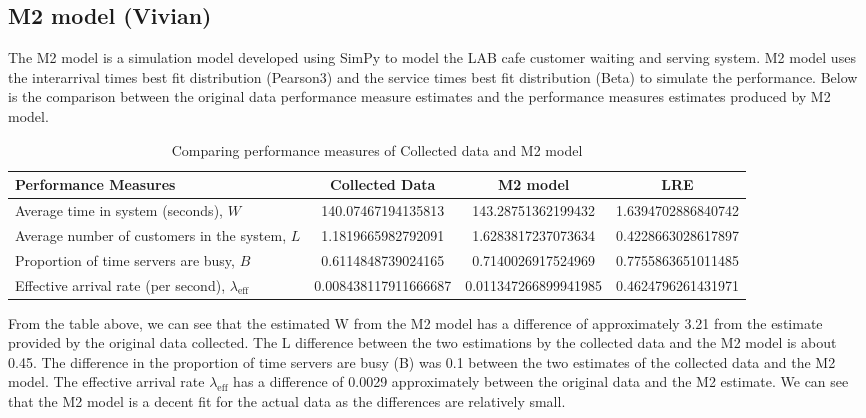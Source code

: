 \documentclass{article}
\begin{document}
\subsection{M2 model (Vivian)}

The M2 model is a simulation model developed using SimPy to model the LAB cafe customer waiting and serving system. M2 model uses the interarrival times best fit distribution (Pearson3) and the service times best fit distribution (Beta) to simulate the performance. Below is the comparison between the original data performance measure estimates and the performance measures estimates produced by M2 model.

\begin{table}[H]
    \centering
    \caption{Comparing performance measures of Collected data and M2 model}
    \begin{tabu}{X S S S}
        \toprule
        \textbf{Performance Measures} & \textbf{Collected Data} & \textbf{M2 model}& \textbf{LRE}\\
        \midrule
        Average time in system (seconds), $W$ & 140.07467194135813 & 143.28751362199432 & 1.6394702886840742\\
        Average number of customers in the system, $L$ & 1.1819665982792091 & 1.6283817237073634 & 0.4228663028617897\\
        Proportion of time servers are busy, $B$ & 0.6114848739024165 & 0.7140026917524969 & 0.7755863651011485\\
        Effective arrival rate (per second), $\lambda_{\text{eff}}$ & 0.008438117911666687 & 0.011347266899941985 & 0.4624796261431971\\
        \bottomrule
    \end{tabu}
    \label{tab:M2}
\end{table}

From the table above, we can see that the estimated W from the M2 model has a difference of approximately 3.21 from the estimate provided by the original data collected. The L difference between the two estimations by the collected data and the M2 model is about 0.45. The difference in the proportion of time servers are busy (B) was 0.1 between the two estimates of the collected data and the M2 model. The effective arrival rate $\lambda_{\text{eff}}$ has a difference of 0.0029 approximately between the original data and the M2 estimate. We can see that the M2 model is a decent fit for the actual data as the differences are relatively small.
\end{document}
